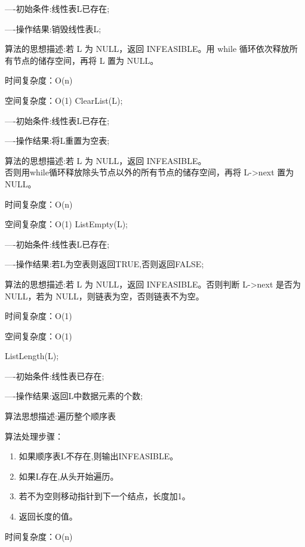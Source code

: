 \documentclass[supercite]{Experimental_Report}
\theoremstyle{definition}
\begin{document}
----初始条件:线性表L已存在;

----操作结果:销毁线性表L;

算法的思想描述:若 L 为 NULL，返回 INFEASIBLE。用 while 循环依次释放所有节点的储存空间，再将 L 置为 NULL。

时间复杂度：O(n)

空间复杂度：O(1)
ClearList(L);

----初始条件:线性表L已存在;

----操作结果:将L重置为空表;

算法的思想描述:若 L 为 NULL，返回 INFEASIBLE。\\否则用while循环释放除头节点以外的所有节点的储存空间，再将 L->next 置为 NULL。

时间复杂度：O(n)

空间复杂度：O(1)
ListEmpty(L);

----初始条件:线性表L已存在;

----操作结果:若L为空表则返回TRUE,否则返回FALSE;

算法的思想描述:若 L 为 NULL，返回 INFEASIBLE。否则判断 L->next 是否为 NULL，若为 NULL，则链表为空，否则链表不为空。

时间复杂度：O(1)

空间复杂度：O(1)

ListLength(L);

----初始条件:线性表已存在;

----操作结果:返回L中数据元素的个数;

算法思想描述:遍历整个顺序表

算法处理步骤：
\begin{enumerate}
	\renewcommand{\labelenumi}{\theenumi)}
	\item 如果顺序表L不存在,则输出INFEASIBLE。
	\item 如果L存在,从头开始遍历。
	\item 若不为空则移动指针到下一个结点，长度加1。
	\item 返回长度的值。
\end{enumerate}

时间复杂度：O(n)
\end{document}

